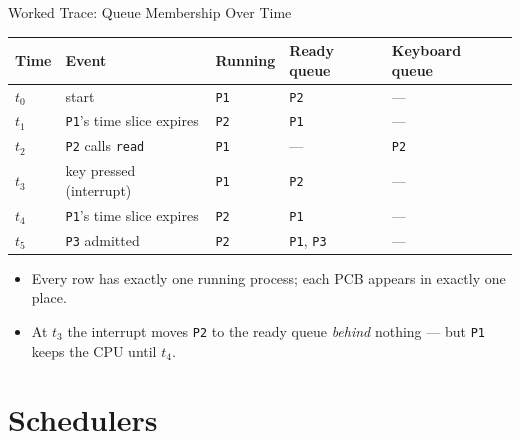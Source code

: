 \documentclass[aspectratio=169]{beamer}
\begin{document}
\begin{frame}{Worked Trace: Queue Membership Over Time}
  \small
  \renewcommand{\arraystretch}{1.2}
  \begin{tabular}{@{}lllll@{}}
    \textbf{Time} & \textbf{Event} & \textbf{Running} & \textbf{Ready queue} & \textbf{Keyboard queue} \\
    \hline
    $t_0$ & start & \texttt{P1} & \texttt{P2} & --- \\
    $t_1$ & \texttt{P1}'s time slice expires & \texttt{P2} & \texttt{P1} & --- \\
    $t_2$ & \texttt{P2} calls \texttt{read} & \texttt{P1} & --- & \texttt{P2} \\
    $t_3$ & key pressed (interrupt) & \texttt{P1} & \texttt{P2} & --- \\
    $t_4$ & \texttt{P1}'s time slice expires & \texttt{P2} & \texttt{P1} & --- \\
    $t_5$ & \texttt{P3} admitted & \texttt{P2} & \texttt{P1}, \texttt{P3} & --- \\
  \end{tabular}
  \vspace{0.25cm}
  \begin{itemize}
    \item Every row has exactly one running process; each PCB appears in
      exactly one place.
    \item At $t_3$ the interrupt moves \texttt{P2} to the ready queue
      \emph{behind} nothing --- but \texttt{P1} keeps the CPU until $t_4$.
  \end{itemize}
\end{frame}


\section{Schedulers}
\end{document}
